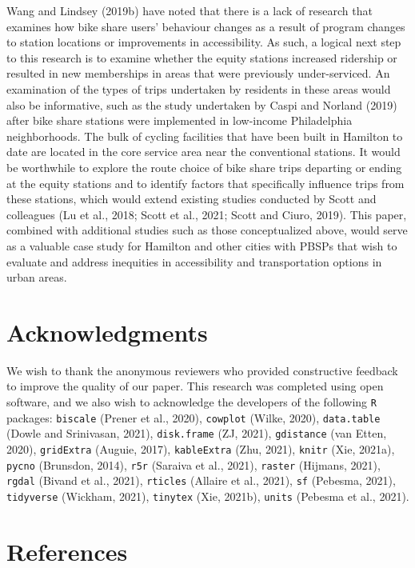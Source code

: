 \documentclass[]{elsarticle} %
\begin{document}
Wang and Lindsey (2019b) have noted that there is a lack of research
that examines how bike share users' behaviour changes as a result of
program changes to station locations or improvements in accessibility.
As such, a logical next step to this research is to examine whether the
equity stations increased ridership or resulted in new memberships in
areas that were previously under-serviced. An examination of the types
of trips undertaken by residents in these areas would also be
informative, such as the study undertaken by Caspi and Norland (2019)
after bike share stations were implemented in low-income Philadelphia
neighborhoods. The bulk of cycling facilities that have been built in
Hamilton to date are located in the core service area near the
conventional stations. It would be worthwhile to explore the route
choice of bike share trips departing or ending at the equity stations
and to identify factors that specifically influence trips from these
stations, which would extend existing studies conducted by Scott and
colleagues (Lu et al., 2018; Scott et al., 2021; Scott and Ciuro, 2019).
This paper, combined with additional studies such as those
conceptualized above, would serve as a valuable case study for Hamilton
and other cities with PBSPs that wish to evaluate and address inequities
in accessibility and transportation options in urban areas.

\hypertarget{acknowledgments}{%
\section{Acknowledgments}\label{acknowledgments}}

We wish to thank the anonymous reviewers who provided constructive
feedback to improve the quality of our paper. This research was
completed using open software, and we also wish to acknowledge the
developers of the following \texttt{R} packages: \texttt{biscale}
(Prener et al., 2020), \texttt{cowplot} (Wilke, 2020),
\texttt{data.table} (Dowle and Srinivasan, 2021), \texttt{disk.frame}
(ZJ, 2021), \texttt{gdistance} (van Etten, 2020), \texttt{gridExtra}
(Auguie, 2017), \texttt{kableExtra} (Zhu, 2021), \texttt{knitr} (Xie,
2021a), \texttt{pycno} (Brunsdon, 2014), \texttt{r5r} (Saraiva et al.,
2021), \texttt{raster} (Hijmans, 2021), \texttt{rgdal} (Bivand et al.,
2021), \texttt{rticles} (Allaire et al., 2021), \texttt{sf} (Pebesma,
2021), \texttt{tidyverse} (Wickham, 2021), \texttt{tinytex} (Xie,
2021b), \texttt{units} (Pebesma et al., 2021).

\hypertarget{references}{%
\section*{References}\label{references}}
\end{document}
